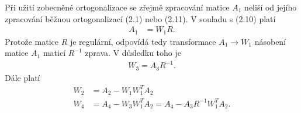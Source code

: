 Při užití zobecněné ortogonalizace se zřejmě zpracování
matice $A_1$ neliší od jejího zpracování běžnou ortogonalizací (2.1)
nebo (2.11). V souladu s (2.10) platí
%
\begin{align*}
   A_1 &= W_1 R.                                            \tag{2.19}
\end{align*}
%
Protože  matice $R$ je regulární, odpovídá tedy transformace
$A_1 \rightarrow W_1$
násobení matice $A_1$ maticí $R^{-1}$ zprava. V důsledku toho je
%
\begin{align*}
\tag{2.20}   W_3 = A_3 R^{-1}.
\end{align*}
%
Dále platí
%
\begin{align*}
\tag{2.21}   W_2 &= A_2 - W_1W_1^TA_2 \\
\tag{2.22}   W_4 &= A_4 - W_3W_1^TA_2  = A_4 - A_3R^{-1}W_1^TA_2.\\
\end{align*}
